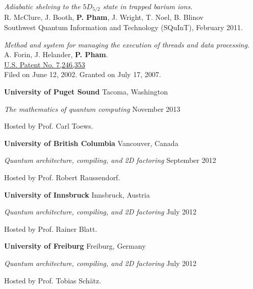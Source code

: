 \documentclass[letter]{article}
\begin{document}
\vspace{\baselineskip}
\par
\emph{Adiabatic shelving to the $5D_{5/2}$ state in trapped barium ions.}\\
R. McClure, J. Booth, \textbf{P. Pham}, J. Wright, T. Noel, B. Blinov\\
Southwest Quantum Information and Technology (SQuInT), February 2011.

\vspace{\baselineskip}

\emph{Method and system for managing the execution of threads and data processing.}
\\
A. Forin, J. Helander, \textbf{P. Pham}.\\
\href{http://patft.uspto.gov/netacgi/nph-Parser?Sect1=PTO2&Sect2=HITOFF&u=%2Fnetahtml%2FPTO%2Fsearch-adv.htm&r=1&p=1&f=G&l=50&d=PTXT&S1=20030233392&OS=20030233392&RS=20030233392}{U.S. Patent No. 7,246,353}\\
Filed on June 12, 2002.
Granted on July 17, 2007.

\vspace{\baselineskip}
\par
{\bf {University of Puget Sound}} \hfill Tacoma, Washington
\par
{\em The mathematics of quantum computing} \hfill November 2013
\par
Hosted by Prof. Carl Toews.

\vspace{\baselineskip}
\par
{\bf {University of British Columbia}} \hfill Vancouver, Canada
\par
{\em Quantum architecture, compiling, and 2D factoring} \hfill September 2012
\par
Hosted by Prof. Robert Raussendorf.

\vspace{\baselineskip}
\par
{\bf {University of Innsbruck}} \hfill Innsbruck, Austria
\par
{\em Quantum architecture, compiling, and 2D factoring} \hfill July 2012
\par
Hosted by Prof. Rainer Blatt.

\vspace{\baselineskip}
\par
{\bf {University of Freiburg}} \hfill Freiburg, Germany
\par
{\em Quantum architecture, compiling, and 2D factoring} \hfill July 2012
\par
Hosted by Prof. Tobias Sch\"atz.
\end{document}
